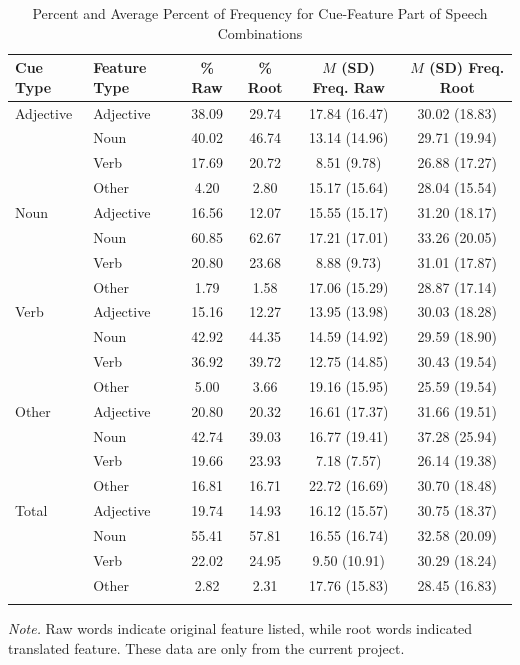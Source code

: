\documentclass[english,,man]{apa6}
\begin{document}
\begin{table}[tbp]
\begin{center}
\begin{threeparttable}
\caption{\label{tab:percent-table}Percent and Average Percent of Frequency for Cue-Feature Part of Speech Combinations}
\begin{tabular}{llcccc}
\toprule
Cue Type & Feature Type & \% Raw & \% Root & $M$ (SD) Freq. Raw & $M$ (SD) Freq. Root\\
\midrule
Adjective & Adjective & 38.09 & 29.74 & 17.84 (16.47) & 30.02 (18.83)\\
 & Noun & 40.02 & 46.74 & 13.14 (14.96) & 29.71 (19.94)\\
 & Verb & 17.69 & 20.72 & 8.51 (9.78) & 26.88 (17.27)\\
 & Other & 4.20 & 2.80 & 15.17 (15.64) & 28.04 (15.54)\\
Noun & Adjective & 16.56 & 12.07 & 15.55 (15.17) & 31.20 (18.17)\\
 & Noun & 60.85 & 62.67 & 17.21 (17.01) & 33.26 (20.05)\\
 & Verb & 20.80 & 23.68 & 8.88 (9.73) & 31.01 (17.87)\\
 & Other & 1.79 & 1.58 & 17.06 (15.29) & 28.87 (17.14)\\
Verb & Adjective & 15.16 & 12.27 & 13.95 (13.98) & 30.03 (18.28)\\
 & Noun & 42.92 & 44.35 & 14.59 (14.92) & 29.59 (18.90)\\
 & Verb & 36.92 & 39.72 & 12.75 (14.85) & 30.43 (19.54)\\
 & Other & 5.00 & 3.66 & 19.16 (15.95) & 25.59 (19.54)\\
Other & Adjective & 20.80 & 20.32 & 16.61 (17.37) & 31.66 (19.51)\\
 & Noun & 42.74 & 39.03 & 16.77 (19.41) & 37.28 (25.94)\\
 & Verb & 19.66 & 23.93 & 7.18 (7.57) & 26.14 (19.38)\\
 & Other & 16.81 & 16.71 & 22.72 (16.69) & 30.70 (18.48)\\
Total & Adjective & 19.74 & 14.93 & 16.12 (15.57) & 30.75 (18.37)\\
 & Noun & 55.41 & 57.81 & 16.55 (16.74) & 32.58 (20.09)\\
 & Verb & 22.02 & 24.95 & 9.50 (10.91) & 30.29 (18.24)\\
 & Other & 2.82 & 2.31 & 17.76 (15.83) & 28.45 (16.83)\\
\bottomrule
\addlinespace
\end{tabular}
\begin{tablenotes}[para]
\normalsize{\textit{Note.} Raw words indicate original feature listed, while root words indicated translated feature. These data are only from the current project.}
\end{tablenotes}
\end{threeparttable}
\end{center}
\end{table}
\end{document}
